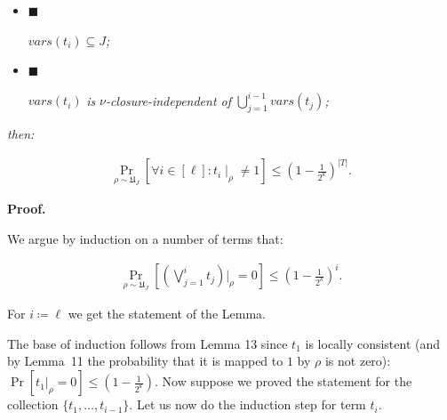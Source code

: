 \begin{itemize}


\item[] 
$\blacksquare$ 


$\textit{vars}(t_{i})\subseteq J$\emph{;}\par





\item[] 
$\blacksquare$ 


$\textit{vars}(t_{i})$\emph{ is }$\nu$\emph{-closure-independent of }$\bigcup\limits_{j=1}^{i-1}\textit{vars}(t_{j})$\emph{;}\par





\end{itemize}


\emph{then:}\par


\[\begin{gathered}
\Pr\limits_{\rho\sim\mathfrak{U}_{J}}[\forall i\in[\ell]\colon t_{i}\mid_{\rho%
}\neq 1]\leq\left(1-\frac{1}{2^{k}}\right)^{|T|}.
\end{gathered}\]






\par\medskip\noindent\textbf{Proof.}\par




We argue by induction on a number of terms that:\par


\[\begin{gathered}
\Pr\limits_{\rho\sim\mathfrak{U}_{J}}\left[\left(\bigvee\limits_{j=1}^{i}t_{j}%
\right)|_{\rho}=0\right]\leq\left(1-\frac{1}{2^{k}}\right)^{i}.
\end{gathered}\]


For $i\coloneqq\ell$ we get the statement of the Lemma.\par




The base of induction follows from Lemma 13 since $t_{1}$ is locally
consistent (and by Lemma 11 the probability that it is mapped to $1$ by $\rho$
is not zero): $\Pr[t_{1}|_{\rho}=0]\leq\left(1-\frac{1}{2^{k}}\right)$. Now suppose we proved the
statement for the collection $\{t_{1},\ldots,t_{i-1}\}$. Let us now do the induction step for term $t_{i}$.\par




